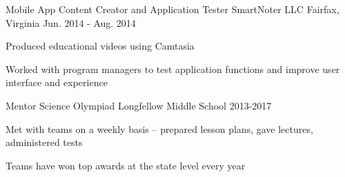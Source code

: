 \begin{cventries}
{    }
    \cventry
    {Mobile App Content Creator and Application Tester}
    {SmartNoter LLC}
    {Fairfax, Virginia}
    {Jun. 2014 - Aug. 2014}
    {
        \begin{cvitems}
            \item{Produced educational videos using Camtasia}
            \item{Worked with program managers to test application functions and improve user interface and experience}
        \end{cvitems}
    }
    \cventry
    {Mentor}
    {Science Olympiad}
    {Longfellow Middle School}
    {2013-2017}
    {
        \begin{cvitems}
		\item{Met with teams on a weekly basis -- prepared lesson plans, gave lectures, administered tests}
        \item{Teams have won top awards at the state level every year}
        \end{cvitems}
    }
\end{cventries}
